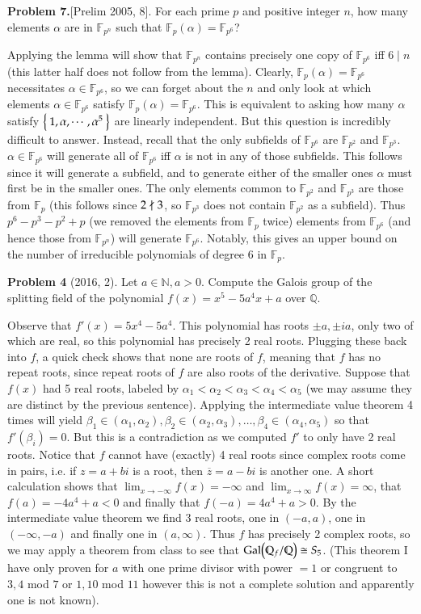 \documentclass[12pt]{article}
\theoremstyle{definitionstyle}
\def\mbb#1{\mathbb{#1}}
\def\bN{\mbb{N}}
\newcommand{\F}{\mbb F}
\newcommand{\Q}{\mbb Q}
\newcommand{\Gal}{\mathrm{Gal}\qty}
\begin{document}
	\textbf{Problem 7.}[Prelim 2005, 8]. For each prime $p$ and positive integer $n$, how many elements $\alpha$ are in $\F_{p^n}$ such that $\F_p(\alpha) = \F_{p^6}$?
	
	Applying the lemma will show that $\F_{p^n}$ contains precisely one copy of $\F_{p^6}$ iff $6 \mid n$ (this latter half does not follow from the lemma). Clearly, $\F_p(\alpha) = \F_{p^6}$ necessitates $\alpha \in \F_{p^6}$, so we can forget about the $n$ and only look at which elements $\alpha \in \F_{p^6}$ satisfy $\F_p(\alpha) = \F_{p^6}$. This is equivalent to asking how many $\alpha$ satisfy $\Set{1, \alpha, \cdots, \alpha^{5}}$ are linearly independent. But this question is incredibly difficult to answer. Instead, recall that the only subfields of $\F_{p^6}$ are $\F_{p^2}$ and $\F_{p^3}$. $\alpha \in \F_{p^6}$ will generate all of $\F_{p^6}$ iff $\alpha$ is not in any of those subfields. This follows since it will generate a subfield, and to generate either of the smaller ones $\alpha$ must first be in the smaller ones. The only elements common to $\F_{p^2}$ and $\F_{p^3}$ are those from $\F_p$ (this follows since $2 \not \mid 3$, so $\F_{p^3}$ does not contain $\F_{p^2}$ as a subfield). Thus $p^6 - p^3 - p^2 + p$ (we removed the elements from $\F_p$ twice) elements from $\F_{p^6}$ (and hence those from $\F_{p^n}$) will generate $\F_{p^6}$. Notably, this gives an upper bound on the number of irreducible polynomials of degree 6 in $\F_p$. 
	
	\newpage
	\textbf{Problem 4} (2016, 2). Let $a \in \bN, a > 0.$ Compute the Galois group of the splitting field of the polynomial $f(x) = x^5-5a^4x+a$ over $\Q$.
	
	Observe that $f'(x) = 5x^4 - 5a^4$. This polynomial has roots $\pm a, \pm ia$, only two of which are real, so this polynomial has precisely 2 real roots. Plugging these back into $f$, a quick check shows that none are roots of $f$, meaning that $f$ has no repeat roots, since repeat roots of $f$ are also roots of the derivative. Suppose that $f(x)$ had 5 real roots, labeled by $\alpha_1 < \alpha_2 < \alpha_3 < \alpha_4 < \alpha_5$ (we may assume they are distinct by the previous sentence). Applying the intermediate value theorem 4 times will yield $\beta_1 \in (\alpha_1, \alpha_2), \beta_2 \in (\alpha_2, \alpha_3), \ldots, \beta_4 \in (\alpha_4, \alpha_5)$ so that $f'(\beta_i) = 0$. But this is a contradiction as we computed $f'$ to only have 2 real roots. Notice that $f$ cannot have (exactly) 4 real roots since complex roots come in pairs, i.e. if $z = a+bi$ is a root, then $\overline z = a-bi$ is another one. A short calculation shows that $\lim_{x \to -\infty} f(x) = -\infty$ and $\lim_{x \to \infty} f(x) = \infty$, that $f(a) = -4a^4 + a < 0$ and finally that $f(-a) = 4a^4 + a > 0$. By the intermediate value theorem we find 3 real roots, one in $(-a, a)$, one in $(-\infty, -a)$ and finally one in $(a, \infty)$. Thus $f$ has precisely 2 complex roots, so we may apply a theorem from class to see that $\Gal(\Q_f/\Q) \cong S_5$. (This theorem I have only proven for $a$ with one prime divisor with power $= 1$ or congruent to $3,4$ mod $7$ or  $1,10$ mod $11$ however this is not a complete solution and apparently one is not known).
	
\end{document}
